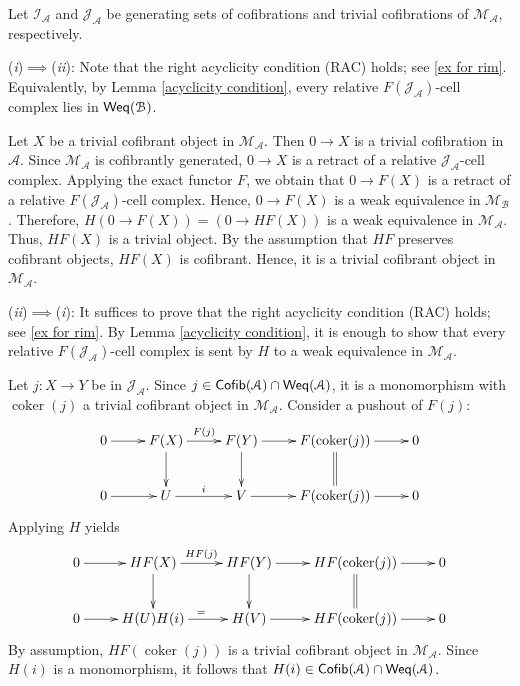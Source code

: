 \documentclass[12pt,twoside]{amsart}
\theoremstyle{bfupright head,slanted body}
\theoremstyle{bfupright head,upright body}
\theoremstyle{fixed bf head,slanted body}
\theoremstyle{fixed bf head,upright body}
\theoremstyle{numbered paragraph}
\newcounter{eqc}
\newenvironment{prf*}[1][Proof]{%
  \begin{proof}[\bf #1]
    \setcounter{equation}{0}
    \renewcommand{\theequation}{\arabic{equation}}}
  {\end{proof}
}
\newcommand{\eqclbl}[1]{{\upshape(\textit{#1})}}
\newcommand{\proofofimp}[3][:]{\mbox{\eqclbl{#2}$\!\implies\!$\eqclbl{#3}#1}}
\numberwithin{equation}{res}
\newcommand{\coker}{\mbox{\rm coker}}
\newcommand{\calA}{\mathcal{A}}
\newcommand{\calB}{\mathcal{B}}
\newcommand{\calM}{\mathcal{M}}
\newcommand{\Cofib}{\sf{Cofib}}
\newcommand{\Weq}{\sf{Weq}}
\begin{document}
\begin{prf*}
Let \(\mathcal I_{\calA}\) and \(\mathcal J_{\calA}\) be generating sets of cofibrations and trivial cofibrations of \(\mathcal M_{\mathcal A}\), respectively.

\proofofimp{i}{ii}
Note that the right acyclicity condition (RAC) holds; see \ref{ex for rim}. Equivalently, by Lemma \ref{acyclicity condition}, every relative \(F(\mathcal J_{\calA})\)-cell complex lies in \(\Weq(\mathcal B)\).

Let \(X\) be a trivial cofibrant object in \(\calM_{\calA}\). Then \(0\to X\) is a trivial cofibration in \(\mathcal A\). Since \(\mathcal M_{\mathcal A}\) is cofibrantly generated, \(0\to X\) is a retract of a relative \(\mathcal J_{\calA}\)-cell complex. Applying the exact functor \(F\), we obtain that \(0\to F(X)\) is a retract of a relative \(F(\mathcal J_{\calA})\)-cell complex. Hence, \(0\to F(X)\) is a weak equivalence in \(\calM_{\calB}\). Therefore,
\(
H(0\to F(X))=(0\to HF(X))
\)
is a weak equivalence in \(\calM_{\calA}\). Thus, \(HF(X)\) is a trivial object. By the assumption that \(HF\) preserves cofibrant objects, \(HF(X)\) is cofibrant. Hence, it is a trivial cofibrant object in \(\calM_{\calA}\).

\proofofimp{ii}{i}
It suffices to prove that the right acyclicity condition (RAC) holds; see \ref{ex for rim}. By Lemma \ref{acyclicity condition}, it is enough to show that every relative
\(F(\mathcal J_\calA)\)-cell complex is sent by \(H\) to a weak equivalence in
\(\calM_\calA\).

Let \(j: X\to Y\) be in \(\mathcal J_{\calA}\). Since \(j\in \Cofib(\mathcal A)\cap\Weq(\mathcal A)\), it is a monomorphism with
\(\operatorname{coker}(j)\) a trivial cofibrant object in \(\calM_\calA\).
Consider a pushout of \(F(j)\):
\[
\xymatrix{
  0
\ar[r]^{}
& F(X)
\ar[d]_{}
\ar[r]^-{F(j)}
& F(Y)
\ar[d]_-{}
\ar[r]^-{}
& F(\coker(j))
\ar@{=}[d]_{}
\ar[r]^{}
& 0                               \\
  0
\ar[r]^{}
& U
\ar[r]^-{i}
& V
\ar[r]^{}
& F(\coker(j))
\ar[r]^{}
& 0
}
\]
Applying \(H\) yields
\[
\xymatrix{
  0
\ar[r]^{}
& HF(X)
\ar[d]_{}
\ar[r]^-{HF(j)}
& HF(Y)
\ar[d]_{}
\ar[r]^{}
& HF(\coker(j))
\ar@{=}[d]_{}
\ar[r]^{}
& 0 \\
  0
\ar[r]^{}
& H(U)
\ar[r]^={H(i)}
& H(V)
\ar[r]^{}
& HF(\coker(j))
\ar[r]^{}
& 0
}
\]
By assumption, \(HF(\operatorname{coker}(j))\) is a trivial cofibrant object in \(\calM_\calA\). Since \(H(i)\) is a monomorphism, it follows that
\(H(i)\in \Cofib(\mathcal A)\cap\Weq(\mathcal A)\).


\end{prf*}
\end{document}
